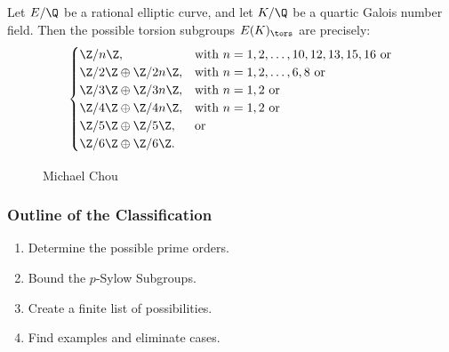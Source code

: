 \begin{frame}[plain]
\small
\begin{thm}[Chou, 2015]
Let $E/\Q$ be a rational elliptic curve, and let $K/\Q$ be a quartic Galois number field. Then the possible torsion subgroups $E(K)_\tors$ are precisely:
	\[
	\begin{cases}
	\Z/n\Z, & \text{with } n= 1, 2, \ldots, 10, 12, 13, 15, 16 \text{ or} \\
	\Z/2\Z \oplus \Z/2n\Z, & \text{with } n= 1, 2, \ldots, 6, 8 \text{ or} \\
	\Z/3\Z \oplus \Z/3n\Z, & \text{with } n= 1, 2 \text{ or} \\
	\Z/4\Z \oplus \Z/4n\Z, & \text{with } n= 1, 2 \text{ or} \\
	\Z/5\Z \oplus \Z/5\Z, & \text{or} \\
	\Z/6\Z \oplus \Z/6\Z.
	\end{cases}
	\]
\end{thm}
	\begin{figure}[!ht]
	\centering
	\captionsetup{labelformat=empty}
	\caption{Michael Chou}
	\end{figure}
\end{frame}









\begin{frame}[plain]
\end{frame}



\begin{frame}[plain]
\frametitle{Outline of the Classification}
        \begin{enumerate}
        \item Determine the possible prime orders. \vfill
        \item Bound the $p$-Sylow Subgroups. \vfill
        \item Create a finite list of possibilities. \vfill
        \item Find examples and eliminate cases. \vfill
        \end{enumerate}
\vfill
\end{frame}





